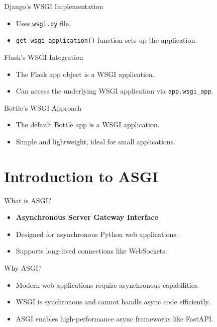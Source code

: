 \documentclass{beamer}
\begin{document}
\begin{frame}{Django's WSGI Implementation}
    \begin{itemize}
        \item Uses \texttt{wsgi.py} file.
        \item \texttt{get\_wsgi\_application()} function sets up the application.
    \end{itemize}
\end{frame}

\begin{frame}{Flask's WSGI Integration}
    \begin{itemize}
        \item The Flask app object is a WSGI application.
        \item Can access the underlying WSGI application via \texttt{app.wsgi\_app}.
    \end{itemize}
\end{frame}

\begin{frame}{Bottle's WSGI Approach}
    \begin{itemize}
        \item The default Bottle app is a WSGI application.
        \item Simple and lightweight, ideal for small applications.
    \end{itemize}
\end{frame}

\section{Introduction to ASGI}

\begin{frame}{What is ASGI?}
    \begin{itemize}
        \item \textbf{Asynchronous Server Gateway Interface}
        \item Designed for asynchronous Python web applications.
        \item Supports long-lived connections like WebSockets.
    \end{itemize}
\end{frame}

\begin{frame}{Why ASGI?}
    \begin{itemize}
        \item Modern web applications require asynchronous capabilities.
        \item WSGI is synchronous and cannot handle async code efficiently.
        \item ASGI enables high-performance async frameworks like FastAPI.
    \end{itemize}
\end{frame}
\end{document}
